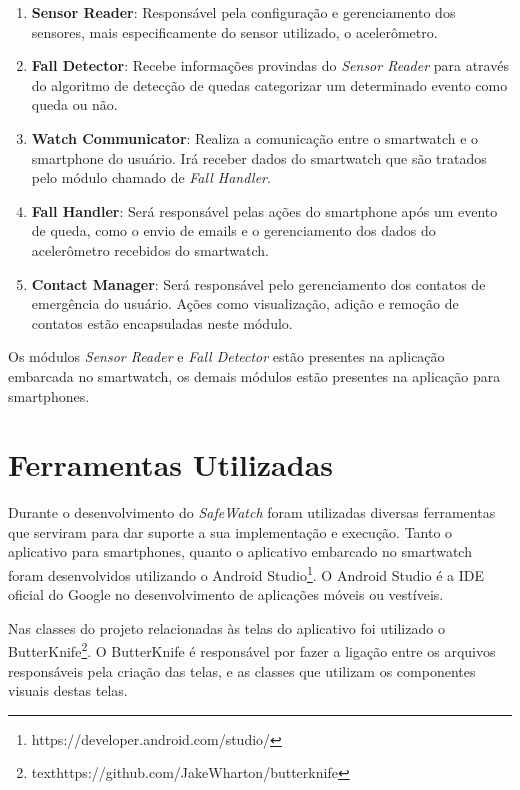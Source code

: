 \begin{enumerate}
	\item{\textbf{Sensor Reader}: Responsável pela configuração e gerenciamento dos sensores, mais especificamente do sensor utilizado, o acelerômetro. }
	
	\item{\textbf{Fall Detector}: Recebe informações provindas do \textit{Sensor Reader} para através do algoritmo de detecção de quedas categorizar um determinado evento como queda ou não.}
	
	\item{\textbf{Watch Communicator}: Realiza a comunicação entre o smartwatch e o smartphone do usuário. Irá receber dados do smartwatch que são tratados pelo módulo chamado de \textit{Fall Handler}.}
	
	\item{\textbf{Fall Handler}: Será responsável pelas ações do smartphone após um evento de queda, como o envio de emails e o gerenciamento dos dados do acelerômetro recebidos do smartwatch.}
	
	\item{\textbf{Contact Manager}: Será responsável pelo gerenciamento dos contatos de emergência do usuário. Ações como visualização, adição e remoção de contatos estão encapsuladas neste módulo.}
			
\end{enumerate}

Os módulos \textit{Sensor Reader} e \textit{Fall Detector} estão presentes na aplicação embarcada no smartwatch, os demais módulos estão presentes na aplicação para smartphones. 



\section{Ferramentas Utilizadas}
\label{sec:tools}
Durante o desenvolvimento do \textit{SafeWatch} foram utilizadas diversas ferramentas que serviram para dar suporte a sua implementação e execução. Tanto o aplicativo para smartphones, quanto o aplicativo embarcado no smartwatch foram desenvolvidos utilizando o Android Studio\footnote{https://developer.android.com/studio/}. O Android Studio é a \ac{IDE} oficial do Google no desenvolvimento de aplicações móveis ou vestíveis.


Nas classes do projeto relacionadas às telas do aplicativo foi utilizado o ButterKnife\footnote{texthttps://github.com/JakeWharton/butterknife}. O ButterKnife é responsável por fazer a ligação entre os arquivos responsáveis pela criação das telas, e as classes que utilizam os componentes visuais destas telas. 


